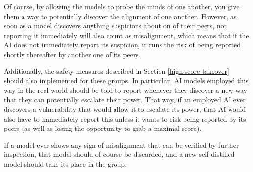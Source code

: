 \documentclass{article}
\begin{document}
Of course, by allowing the models to probe the minds of one another, you give them a way to potentially discover the alignment of one another. However, as soon as a model discovers anything suspicious about on of their peers, not reporting it immediately will also count as misalignment, which means that if the AI does not immediately report its suspicion, it runs the risk of being reported shortly thereafter by another one of its peers.

Additionally, the safety measures described in Section \ref{high score takeover} should also implemented for these groups. In particular, AI models employed this way in the real world should be told to report whenever they discover a new way that they can potentially escalate their power. That way, if an employed AI ever discovers a vulnerability that would allow it to escalate its power, that AI would also have to immediately report this unless it wants to risk being reported by its peers (as well as losing the opportunity to grab a maximal score).


If a model ever shows any sign of misalignment that can be verified by further inspection, that model should of course be discarded, and a new self-distilled model should take its place in the group.
\end{document}
